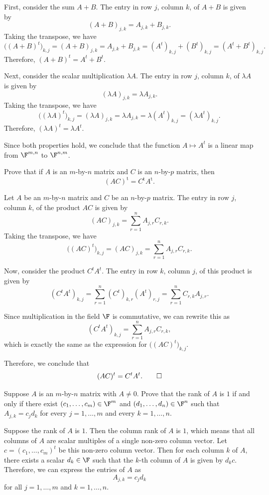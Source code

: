 \begin{exc}
\begin{solution}
First, consider the sum $A+B$. The entry in row $j$, column $k$, of $A+B$ is
given by
\[ (A+B)_{j,k} = A_{j,k}+B_{j,k}. \]
Taking the transpose, we have
\[ \bigl((A+B)^t\bigr)_{k,j} = (A+B)_{j,k} = A_{j,k}+B_{j,k}
   = (A^t)_{k,j}+(B^t)_{k,j} = (A^t+B^t)_{k,j}. \]
Therefore, $(A+B)^t=A^t+B^t$.

Next, consider the scalar multiplication $\lambda A$. The entry in row $j$,
column $k$, of $\lambda A$ is given by
\[ (\lambda A)_{j,k} = \lambda A_{j,k}. \]
Taking the transpose, we have
\[ \bigl((\lambda A)^t\bigr)_{k,j} = (\lambda A)_{j,k} = \lambda A_{j,k}
   = \lambda(A^t)_{k,j} = (\lambda A^t)_{k,j}. \]
Therefore, $(\lambda A)^t=\lambda A^t$.

Since both properties hold, we conclude that the function $A\mapsto A^t$ is a
linear map from $\F^{m,n}$ to $\F^{n,m}$.
\end{solution}

\begin{exercise}
Prove that if $A$ is an $m$-by-$n$ matrix and $C$ is an $n$-by-$p$ matrix,
then
\[ (AC)^{\mathrm{t}} = C^{\mathrm{t}}A^{\mathrm{t}}. \]
\end{exercise}
\begin{solution}
Let $A$ be an $m$-by-$n$ matrix and $C$ be an $n$-by-$p$ matrix. The entry in
row $j$, column $k$, of the product $AC$ is given by
\[ (AC)_{j,k} = \sum_{r=1}^n A_{j,r}C_{r,k}. \]
Taking the transpose, we have
\[ \bigl((AC)^t\bigr)_{k,j} = (AC)_{j,k} = \sum_{r=1}^n A_{j,r}C_{r,k}. \]

Now, consider the product $C^tA^t$. The entry in row $k$, column $j$, of this
product is given by
\[ (C^tA^t)_{k,j} = \sum_{r=1}^n (C^t)_{k,r}(A^t)_{r,j}
   = \sum_{r=1}^n C_{r,k}A_{j,r}. \]

Since multiplication in the field $\F$ is commutative, we can rewrite this as
\[ (C^tA^t)_{k,j} = \sum_{r=1}^n A_{j,r}C_{r,k}, \]
which is exactly the same as the expression for $\bigl((AC)^t\bigr)_{k,j}$.

Therefore, we conclude that
\[ (AC)^t = C^tA^t. \qedhere \]
\end{solution}

\begin{exercise}
Suppose $A$ is an $m$-by-$n$ matrix with $A\ne0$. Prove that the rank of $A$
is $1$ if and only if there exist $(c_1,\dots,c_m)\in\F^m$ and
$(d_1,\dots,d_n)\in\F^n$ such that $A_{j,k}=c_jd_k$ for every $j=1,\dots,m$
and every $k=1,\dots,n$.
\end{exercise}
\begin{solution}
Suppose the rank of $A$ is $1$. Then the column rank of $A$ is $1$, which means
that all columns of $A$ are scalar multiples of a single non-zero column
vector. Let $c=(c_1,\dots,c_m)^t$ be this non-zero column vector. Then for each
column $k$ of $A$, there exists a scalar $d_k\in\F$ such that the $k$-th column
of $A$ is given by $d_kc$. Therefore, we can express the entries of $A$ as
\[ A_{j,k} = c_jd_k \]
for all $j=1,\dots,m$ and $k=1,\dots,n$.


\end{solution}
\end{exc}
